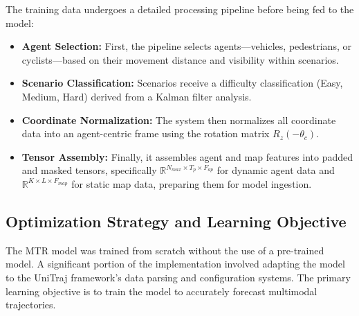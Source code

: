 The training data undergoes a detailed processing pipeline before being fed to the model:
\begin{itemize}
    \item \textbf{Agent Selection:} First, the pipeline selects agents—vehicles, pedestrians, or cyclists—based on their movement distance and visibility within scenarios.
    \item \textbf{Scenario Classification:} Scenarios receive a difficulty classification (Easy, Medium, Hard) derived from a Kalman filter analysis.
    \item \textbf{Coordinate Normalization:} The system then normalizes all coordinate data into an agent-centric frame using the rotation matrix $R_{z}(-\theta_{c})$.
    \item \textbf{Tensor Assembly:} Finally, it assembles agent and map features into padded and masked tensors, specifically $\mathbb{R}^{N_{max}\times T_{p}\times F_{ap}}$ for dynamic agent data and $\mathbb{R}^{K\times L\times F_{map}}$ for static map data, preparing them for model ingestion.
\end{itemize}

\subsection{Optimization Strategy and Learning Objective}
\label{sec:exp_optimization_merged}

The MTR model was trained from scratch without the use of a pre-trained model. A significant portion of the implementation involved adapting the model to the UniTraj framework's data parsing and configuration systems.
The primary learning objective is to train the model to accurately forecast multimodal trajectories.

